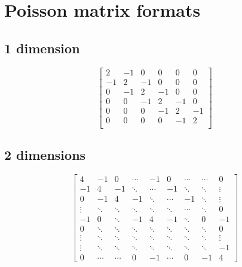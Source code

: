 

\section{Poisson matrix formats} %
\label{sec:poisson_matrix_format}

\subsection{1 dimension} %
\label{sub:1_dimension}

\[
  \begin{bmatrix}
    2 & -1 & 0 & 0 & 0 & 0 \\
    -1 & 2 & -1 & 0 & 0 & 0 \\
    0 & -1 & 2 & -1 & 0 & 0 \\
    0 & 0 & -1 & 2 & -1 & 0 \\
    0 & 0 & 0 & -1 & 2 & -1 \\
    0 & 0 & 0 & 0 & -1 & 2 \\
  \end{bmatrix}
\]

\subsection{2 dimensions} %
\label{sub:2_dimensions}

\[
  \begin{bmatrix}
    4 & -1 & 0 & \cdots & -1 & 0 & \cdots & \cdots & 0\\
    -1 & 4 & -1 & \ddots & \cdots & -1 & \ddots & \ddots & \vdots\\
    0 & -1 & 4 & -1 & \ddots & \cdots & -1 & \ddots & \vdots\\
    \vdots & \ddots & \ddots & \ddots & \ddots & \ddots & \cdots & \ddots & 0\\
    -1 & 0 & \ddots & -1 & 4 & -1 & \ddots & 0 & -1\\
    0 & \ddots & \ddots & \ddots & \ddots & \ddots & \ddots & \ddots & 0\\
    \vdots & \ddots & \ddots & \ddots & \ddots & \ddots & \ddots & \ddots & \vdots\\
    \vdots & \ddots & \ddots & \ddots & \ddots & \ddots & \ddots & \ddots & -1\\
    0 & \cdots & \cdots & 0 & -1 & \cdots & 0 & -1 & 4
  \end{bmatrix}
\]


